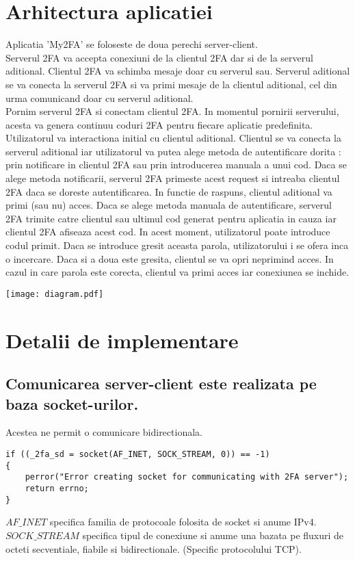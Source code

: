 \documentclass{article}
\begin{document}
	\section{Arhitectura aplicatiei}
	Aplicatia 'My2FA' se foloseste de doua perechi server-client. \\
	Serverul 2FA va accepta conexiuni de la clientul 2FA dar si de la serverul aditional. Clientul 2FA va schimba mesaje doar cu serverul sau. Serverul aditional se va conecta la serverul 2FA si va primi mesaje de la clientul aditional, cel din urma comunicand doar cu serverul aditional. \\
	Pornim serverul 2FA si conectam clientul 2FA. In momentul pornirii serverului, acesta va genera continuu coduri 2FA pentru fiecare aplicatie predefinita. Utilizatorul va interactiona initial cu clientul aditional. Clientul se va conecta la serverul aditional iar utilizatorul va putea alege metoda de autentificare dorita : prin notificare in clientul 2FA sau prin introducerea manuala a unui cod. Daca se alege metoda notificarii, serverul 2FA primeste acest request si intreaba clientul 2FA daca se doreste autentificarea. In functie de raspuns, clientul aditional va primi (sau nu) acces. Daca se alege metoda manuala de autentificare, serverul 2FA trimite catre clientul sau ultimul cod generat pentru aplicatia in cauza iar clientul 2FA afiseaza acest cod. In acest moment, utilizatorul poate introduce codul primit. Daca se introduce gresit aceasta parola, utilizatorului i se ofera inca o incercare. Daca si a doua este gresita, clientul se va opri neprimind acces. In cazul in care parola este corecta, clientul va primi acces iar conexiunea se inchide.
	
	
	\texttt{[image: diagram.pdf]}
	
	\section{Detalii de implementare}
	\subsection{Comunicarea server-client este realizata pe baza socket-urilor.}
	Acestea ne permit o comunicare bidirectionala.
	
	\begin{tcolorbox}[colback=green!5,colframe=green!40!black,width = \linewidth, title = Crearea unui socket TCP]
		\begin{Verbatim}[tabsize=4]
if ((_2fa_sd = socket(AF_INET, SOCK_STREAM, 0)) == -1)
{
	perror("Error creating socket for communicating with 2FA server");
	return errno;
}
		\end{Verbatim}
	\end{tcolorbox} 
	\noindent
	$AF\_INET$ specifica familia de protocoale folosita de socket si anume IPv4. \\
	$SOCK\_STREAM$ specifica tipul de conexiune si anume una bazata pe fluxuri de octeti secventiale, fiabile si bidirectionale. (Specific protocolului TCP).
	
\end{document}
